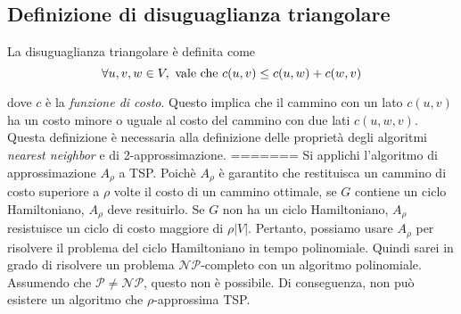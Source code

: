 \subsection{Definizione di disuguaglianza triangolare}

La disuguaglianza triangolare è definita come
\begin{equation}
    \forall u, v, w \in V, \textnormal{ vale che } c(u, v) \le c(u, w) + c(w, v)
\end{equation}

dove $c$ è la \textit{funzione di costo}. Questo implica che il cammino con un lato $c(u, v)$ ha un costo
minore o uguale al costo del cammino con due lati $c(u, w, v)$. \\

Questa definizione è necessaria alla definizione delle proprietà degli algoritmi \textit{nearest neighbor} e di 2-approssimazione.
=======
Si applichi l'algoritmo di approssimazione $A_{\rho}$ a TSP. Poichè $A_{\rho}$ è garantito
che restituisca un cammino di costo superiore a $\rho$ volte il costo di un cammino ottimale,
se $G$ contiene un ciclo Hamiltoniano, $A_{\rho}$ deve resituirlo. Se $G$ non ha un ciclo
Hamiltoniano, $A_{\rho}$ resistuisce un ciclo di costo maggiore di $\rho |V|$.
Pertanto, possiamo usare $A_{\rho}$ per risolvere il problema del ciclo Hamiltoniano in
tempo polinomiale. Quindi sarei in grado di risolvere un problema $\mathcal{NP}$-completo
con un algoritmo polinomiale. Assumendo che $\mathcal{P} \ne \mathcal{NP}$, questo non è
possibile. Di conseguenza, non può esistere un algoritmo che $\rho$-approssima TSP.
